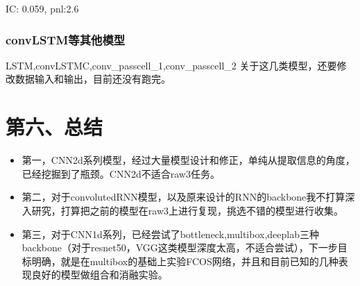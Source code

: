 \documentclass[11pt]{ctexart}
\begin{document}
{\kaishu \small IC: 0.059, pnl:2.6}


\subsubsection{convLSTM等其他模型}
LSTM,convLSTMC,conv\_passcell\_1,conv\_passcell\_2
关于这几类模型，还要修改数据输入和输出，目前还没有跑完。


\section{第六、总结}
\begin{itemize}
  \item [1)]
  第一，CNN2d系列模型，经过大量模型设计和修正，单纯从提取信息的角度，已经挖掘到了瓶颈。CNN2d不适合raw3任务。
  \item [2)]
  第二，对于convolutedRNN模型，以及原来设计的RNN的backbone我不打算深入研究，打算把之前的模型在raw3上进行复现，挑选不错的模型进行收集。
  \item [3)]
  第三，对于CNN1d系列，已经尝试了bottleneck,multibox,deeplab三种backbone（对于resnet50，VGG这类模型深度太高，不适合尝试），下一步目标明确，就是在multibox的基础上实验FCOS网络，并且和目前已知的几种表现良好的模型做组合和消融实验。
\end{itemize}
\end{document}
